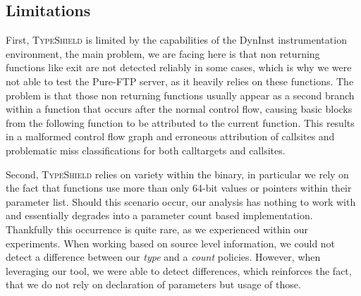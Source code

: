 % 
% 

\subsection{Limitations}
First, \textsc{TypeShield} is limited by the capabilities of the DynInst instrumentation environment, the main problem,
we are facing here is that non returning functions like exit are not detected reliably in some cases, which is
why we were not able to test the Pure-FTP server, as it heavily relies on these functions. The problem is that
those non returning functions usually appear as a second branch within a function that occurs after the normal
control flow, causing basic blocks from the following function to be attributed to the current function. This
results in a malformed control flow graph and erroneous attribution of callsites and problematic miss classifications
for both calltargets and callsites.

Second, \textsc{TypeShield} relies on variety within the binary, in particular we rely on
the fact that functions use more than only 64-bit values or pointers within their parameter list. Should this
scenario occur, our analysis has nothing to work with and essentially degrades into a parameter count based
implementation. Thankfully this occurrence is quite rare, as we experienced within our experiments. When working
based on source level information, we could not detect a difference between our \textit{type} and a \textit{count} policies. 
However, when leveraging our tool, we were able to detect differences, which reinforces the fact, that we do 
not rely on declaration of parameters but usage of those.

